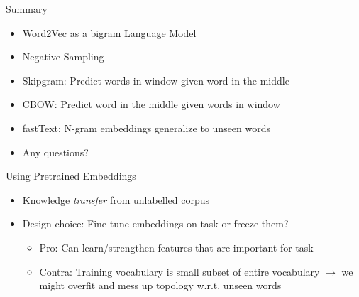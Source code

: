 \begin{vbframe}{Summary}

\vfill

\begin{itemize}
	\item Word2Vec as a bigram Language Model
	\item Negative Sampling
	\item Skipgram: Predict words in window given word in the middle
	\item CBOW: Predict word in the middle given words in window
	\item fastText: N-gram embeddings generalize to unseen words
	\item Any questions?
\end{itemize}

\vfill

\end{vbframe}


\begin{vbframe}{Using Pretrained Embeddings}

\vfill

\begin{itemize}
	\item Knowledge \emph{transfer} from unlabelled corpus
	\item Design choice: Fine-tune embeddings on task or freeze them?
		\begin{itemize}
			\item Pro: Can learn/strengthen features that are important for task
			\item Contra: Training vocabulary is small subset of entire vocabulary $\rightarrow$ we might overfit and mess up topology w.r.t. unseen words
		\end{itemize}
\end{itemize}

\vfill

\end{vbframe}


